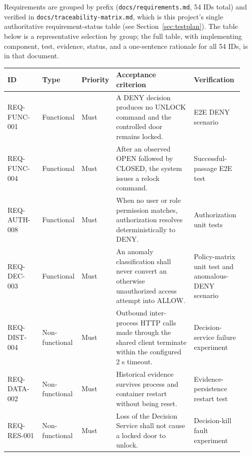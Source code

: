 \documentclass[11pt]{article}
\begin{document}
Requirements are grouped by prefix (\texttt{docs/requirements.md}, 54
IDs total) and verified in \texttt{docs/traceability-matrix.md}, which is
this project's single authoritative requirement-status table (see
Section~\ref{sec:testplan}). The table below is a representative
selection by group; the full table, with implementing component, test,
evidence, status, and a one-sentence rationale for all 54 IDs, is in that
document.

\begin{longtable}[]{@{}
  >{\raggedright\arraybackslash}p{0.15\linewidth}
  >{\raggedright\arraybackslash}p{0.14\linewidth}
  >{\raggedright\arraybackslash}p{0.10\linewidth}
  >{\raggedright\arraybackslash}p{0.34\linewidth}
  >{\raggedright\arraybackslash}p{0.21\linewidth}@{}}
\toprule
\textbf{ID} &
\textbf{Type} &
\textbf{Priority} &
\textbf{Acceptance criterion} &
\textbf{Verification} \\
\midrule
\endhead

REQ-FUNC-001 &
Functional &
Must &
A DENY decision produces no UNLOCK command and the controlled door remains locked. &
E2E DENY scenario \\

REQ-FUNC-004 &
Functional &
Must &
After an observed OPEN followed by CLOSED, the system issues a relock command. &
Successful-passage E2E test \\

REQ-AUTH-008 &
Functional &
Must &
When no user or role permission matches, authorization resolves deterministically to DENY. &
Authorization unit tests \\

REQ-DEC-003 &
Functional &
Must &
An anomaly classification shall never convert an otherwise unauthorized access attempt into ALLOW. &
Policy-matrix unit test and anomalous-DENY scenario \\

REQ-DIST-004 &
Non-functional &
Must &
Outbound inter-process HTTP calls made through the shared client terminate within the configured 2 s timeout. &
Decision-service failure experiment \\

REQ-DATA-002 &
Non-functional &
Must &
Historical evidence survives process and container restart without being reset. &
Evidence-persistence restart test \\

REQ-RES-001 &
Non-functional &
Must &
Loss of the Decision Service shall not cause a locked door to unlock. &
Decision-kill fault experiment \\


\end{longtable}
\end{document}
